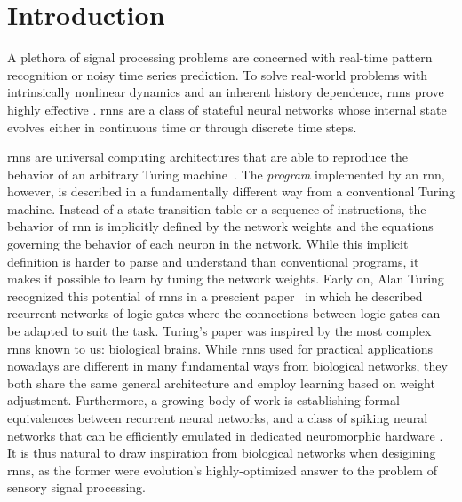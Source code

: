 \documentclass[journal,onecolumn,11pt]{IEEEtran}
\begin{document}
\section{Introduction}
A plethora of signal processing problems are concerned with real-time pattern recognition or noisy time series prediction.
To solve real-world problems with intrinsically nonlinear dynamics and an inherent history dependence, \glspl{rnn} prove highly effective \cite{Goodfellow_etal16_deeplear}. 
\glspl{rnn} are a class of stateful neural networks whose internal state evolves either in continuous time or through discrete time steps.

\glspl{rnn} are universal computing architectures that are able to reproduce the behavior of an arbitrary Turing machine~\cite{Siegelmann_Sontag95}.
The {\it program} implemented by an \gls{rnn}, however, is described in a fundamentally different way from a conventional Turing machine.
Instead of a state transition table or a sequence of instructions, the behavior of \gls{rnn} is implicitly defined by the network weights and the equations governing the behavior of each neuron in the network.
While this implicit definition is harder to parse and understand than conventional programs, it makes it possible to learn by tuning the network weights.
Early on, Alan Turing recognized this potential of \glspl{rnn} in a prescient paper~\cite{Ince92} in which he described recurrent networks of logic gates where the connections between logic gates can be adapted to suit the task.
Turing's paper was inspired by the most complex \glspl{rnn} known to us: biological brains.
While \glspl{rnn} used for practical applications nowadays are different in many fundamental ways from biological networks, they both share the same general architecture and employ learning based on weight adjustment.
Furthermore, a growing body of work is establishing formal equivalences between recurrent neural networks, and a class of spiking neural networks that can be efficiently emulated in dedicated neuromorphic hardware \cite{Zenke_Ganguli17_supesupe,Wozniak_etal18,Neftci18_datapowe,Bellec_etal18_longshor}. 
It is thus natural to draw inspiration from biological networks when desigining \glspl{rnn}, as the former were evolution's highly-optimized answer to the problem of sensory signal processing. 
\end{document}

